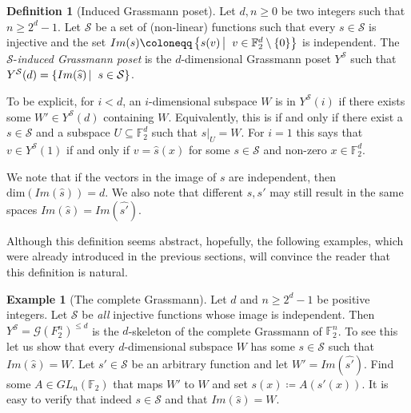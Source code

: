 \documentclass[10pt,a4paper]{article}
\theoremstyle{definition}
\newtheorem{definition}[theorem]{Definition}
\newtheorem{example}[theorem]{Example}
\theoremstyle{remark}
\newcommand\sett[2]{\left\{ #1 \left| \; \vphantom{#1 #2} \right. #2  \right\}}
\newcommand{\set}[1]{\{#1\}}
\def\dim{\mathrm{ dim}}
\newcommand{\F}{\mathbb{F}}
\renewcommand{\leq}{\leqslant}
\renewcommand{\geq}{\geqslant}
\numberwithin{equation}{section}
\def\Y{Y}
\begin{document}
\begin{definition}[Induced Grassmann poset]
    Let \(d,n \geq 0\) be two integers such that \(n \geq 2^d-1\). Let \(\mathcal{S}\) %
    be a set of (non-linear) functions such that every \(s \in \mathcal{S}\) is injective and the set \( Im(s) \coloneqq \sett{s(v)}{v \in \F_2^d \setminus \set{0}}\) is independent. The \(\mathcal{S}\)-\emph{induced Grassmann poset} is the \(d\)-dimensional Grassmann poset \(Y^{\mathcal{S}}\) such that \(Y^{\mathcal{S}}(d) = \sett{Im(\widehat{s})}{s \in \mathcal{S}}\).
\end{definition}
To be explicit, for \(i < d\), an \(i\)-dimensional subspace \(W\) is in \(\Y^{\mathcal{S}}(i)\) if there exists some \(W' \in \Y^{\mathcal{S}}(d)\) containing \(W\). Equivalently, this is if and only if there exist a \(s \in \mathcal{S}\) and a subspace \(U \subseteq \F_2^d\) such that \(\widehat{s}|_U = W\). For \(i=1\) this says that \(v \in \Y^{\mathcal{S}}(1)\) if and only if \(v=\widehat{s}(x)\) for some \(s \in \mathcal{S}\) and non-zero \(x \in \F_2^d\). 

We note that if the vectors in the image of \(s\) are independent, then \(\dim(Im(\widehat{s})) = d\). We also note that different \(s,s'\) may still result in the same spaces \(Im(\widehat{s}) = Im(\widehat{s'})\).

Although this definition seems abstract, hopefully, the following examples, which were already introduced in the previous sections, will convince the reader that this definition is natural.
\begin{example}[The complete Grassmann]
    Let \(d\) and \(n \geq 2^d-1\) be positive integers. Let \(\mathcal{S}\) be \emph{all} injective functions whose image is independent. Then \(\Y^\mathcal{S} = \mathcal{G}(F_2^n)^{\leq d}\) is the \(d\)-skeleton of the complete Grassmann of \(\F_2^n\). To see this let us show that every \(d\)-dimensional subspace \(W\) has some \(s \in \mathcal{S}\) such that \(Im(\widehat{s})=W\). Let \(s' \in \mathcal{S}\) be an arbitrary function and let \(W' = Im(\widehat{s'})\). Find some \(A \in GL_n(\F_2)\) that maps \(W'\) to \(W\) and set \(s(x) \coloneqq A(s'(x))\). It is easy to verify that indeed \(s \in \mathcal{S}\) and that \(Im(\widehat{s}) = W\).
\end{example}
\end{document}

